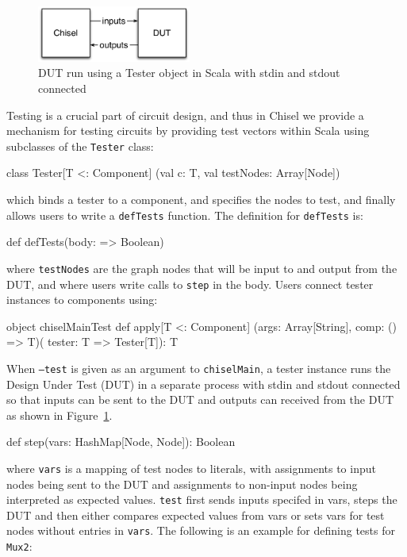 \documentclass[10pt,twocolumn]{article}
\def\code#1{{\small\tt #1}}
\begin{document}
\begin{figure}
\begin{center}
\includegraphics[width=0.45\textwidth]{../tutorial/figs/DUT.pdf}
\end{center}
\caption{DUT run using a Tester object in Scala with stdin and stdout connected}
\label{fig:dut}
\end{figure}
 
Testing is a crucial part of circuit design, 
and thus in Chisel we provide a mechanism for
testing circuits by providing test vectors within Scala using
subclasses of the \code{Tester} class:

\begin{scala}
class Tester[T <: Component]
  (val c: T, val testNodes: Array[Node])
\end{scala}

\noindent
which binds a tester to a component, and specifies the nodes to test,
and finally allows users to write a \code{defTests} function.
The definition for \code{defTests} is:

\begin{scala}
def defTests(body: => Boolean)
\end{scala}

\noindent
where \code{testNodes} are the graph nodes that will be input to and
output from the DUT, and where
users write calls to \code{step} in the body.  Users connect tester
instances to components using:

\begin{scala}
object chiselMainTest {
  def apply[T <: Component]
    (args: Array[String], comp: () => T)(
     tester: T => Tester[T]): T
}
\end{scala}

\noindent
When \code{--test} is given as an argument to \code{chiselMain}, a
tester instance runs the Design Under Test (DUT) in a separate
process with stdin and stdout connected so that inputs can be sent to
the DUT and outputs can received from the DUT as shown in
Figure~\ref{fig:dut}.
\noindent

\begin{scala}
def step(vars: HashMap[Node, Node]): Boolean
\end{scala}

\noindent
where \code{vars} is a mapping of test nodes to literals, 
with assignments to input nodes being sent to the DUT and assignments to
non-input nodes being interpreted as expected values.
\code{test} first sends inputs specifed in vars, steps the DUT and then either
compares expected values from vars or sets vars for test nodes without
entries in \code{vars}.
The following is an example for defining tests for \code{Mux2}:
\end{document}
